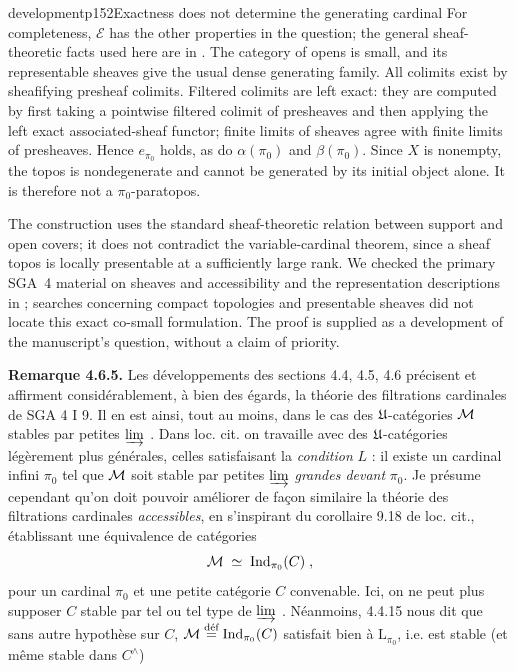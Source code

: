 \begin{dcomment}{development}{p152}{Exactness does not determine the generating cardinal}
For completeness, $\mathcal E$ has the other properties in the question; the general sheaf-theoretic facts used here are in \citet[Expos\'e~II, Theorem~4.1 and Corollary~4.1.1]{SGA4I1972}. The category of opens is small, and its representable sheaves give the usual dense generating family. All colimits exist by sheafifying presheaf colimits. Filtered colimits are left exact: they are computed by first taking a pointwise filtered colimit of presheaves and then applying the left exact associated-sheaf functor; finite limits of sheaves agree with finite limits of presheaves. Hence $e_{\pi_0}$ holds, as do $\alpha(\pi_0)$ and $\beta(\pi_0)$. Since $X$ is nonempty, the topos is nondegenerate and cannot be generated by its initial object alone. It is therefore not a $\pi_0$-paratopos.

The construction uses the standard sheaf-theoretic relation between support and open covers; it does not contradict the variable-cardinal theorem, since a sheaf topos is locally presentable at a sufficiently large rank. We checked the primary SGA~4 material on sheaves and accessibility and the representation descriptions in \citet{AdamekRosicky1994}; searches concerning compact topologies and presentable sheaves did not locate this exact co-small formulation. The proof is supplied as a development of the manuscript's question, without a claim of priority.
\end{dcomment}


\textbf{Remarque 4.6.5.} Les développements des sections 4.4, 4.5, 4.6 précisent et affirment considérablement, à bien des égards, la théorie des filtrations cardinales de SGA 4 I 9. Il en est ainsi, tout au moins, dans le cas des $\mathfrak{U}$-catégories $\mathcal{M}$ stables par petites $\varinjlim$ . Dans loc. cit. on travaille avec des $\mathfrak{U}$-catégories légèrement plus générales, celles satisfaisant
la \textit{condition} $L$ : il existe un cardinal infini $\pi_0$ tel que $\mathcal{M}$ soit stable par petites $\varinjlim$ \textit{grandes devant} $\pi_0$. Je présume cependant qu'on doit pouvoir améliorer de façon similaire la théorie des filtrations cardinales \textit{accessibles}, en s'inspirant du corollaire 9.18 de loc. cit., établissant une équivalence de catégories
\[
\mathcal{M} \;\simeq\; \mathrm{Ind}_{\pi_0}(C)\;,
\]
pour un cardinal $\pi_0$ et une petite catégorie $C$ convenable. Ici, on ne peut plus supposer $C$ stable par tel ou tel type de $\varinjlim$ . Néanmoins, 4.4.15 nous dit que sans autre hypothèse sur $C$, $\mathcal{M} \overset{\text{déf}}{=} \mathrm{Ind}_{\pi_0}(C)$ satisfait bien à $\mathrm{L}_{\pi_0}$, i.e. est stable (et même stable dans $C^{\wedge}$)

